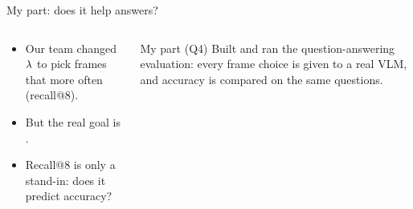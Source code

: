 \documentclass[aspectratio=169,11pt]{beamer}
\subtitle{Part 3: Do Better Frames Give Better Answers? (Q4)}
\author[Makhmud Assentay]{Makhmud Assentay \\ \small with Jianxiang He and Longtao Jiang}
\begin{document}
\titleframe
{}
\contextframe

\begin{frame}{My part: does it help answers?}
  \begin{columns}[T,onlytextwidth]
    \begin{column}{0.5\textwidth}
      \begin{itemize}
        \item Our team changed $\lambda$ to pick frames that  more often (recall@8).
        \item But the real goal is .
        \item Recall@8 is only a stand-in: does it predict accuracy?
      \end{itemize}
    \end{column}
    \begin{column}{0.46\textwidth}
      \begin{block}{My part (Q4)}
        Built and ran the question-answering evaluation: every frame choice is given to a real VLM, and accuracy is compared on the same questions.
      \end{block}
    \end{column}
  \end{columns}
\end{frame}
\end{document}
